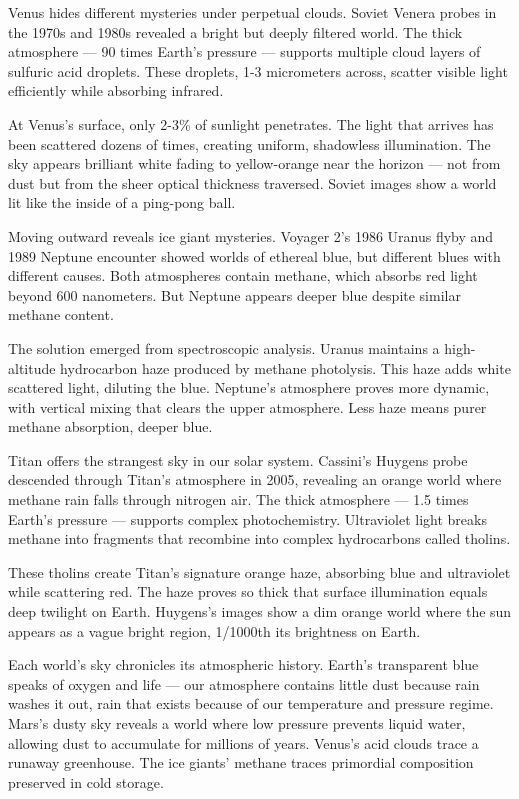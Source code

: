 Venus hides different mysteries under perpetual clouds. Soviet Venera probes in the 1970s and 1980s revealed a bright but deeply filtered world. The thick atmosphere — 90 times Earth's pressure — supports multiple cloud layers of sulfuric acid droplets. These droplets, 1-3 micrometers across, scatter visible light efficiently while absorbing infrared.

At Venus's surface, only 2-3\% of sunlight penetrates. The light that arrives has been scattered dozens of times, creating uniform, shadowless illumination. The sky appears brilliant white fading to yellow-orange near the horizon — not from dust but from the sheer optical thickness traversed. Soviet images show a world lit like the inside of a ping-pong ball.

Moving outward reveals ice giant mysteries. Voyager 2's 1986 Uranus flyby and 1989 Neptune encounter showed worlds of ethereal blue, but different blues with different causes. Both atmospheres contain methane, which absorbs red light beyond 600 nanometers. But Neptune appears deeper blue despite similar methane content.

The solution emerged from spectroscopic analysis. Uranus maintains a high-altitude hydrocarbon haze produced by methane photolysis. This haze adds white scattered light, diluting the blue. Neptune's atmosphere proves more dynamic, with vertical mixing that clears the upper atmosphere. Less haze means purer methane absorption, deeper blue.

Titan offers the strangest sky in our solar system. Cassini's Huygens probe descended through Titan's atmosphere in 2005, revealing an orange world where methane rain falls through nitrogen air. The thick atmosphere — 1.5 times Earth's pressure — supports complex photochemistry. Ultraviolet light breaks methane into fragments that recombine into complex hydrocarbons called tholins.

These tholins create Titan's signature orange haze, absorbing blue and ultraviolet while scattering red. The haze proves so thick that surface illumination equals deep twilight on Earth. Huygens's images show a dim orange world where the sun appears as a vague bright region, 1/1000th its brightness on Earth.

Each world's sky chronicles its atmospheric history. Earth's transparent blue speaks of oxygen and life — our atmosphere contains little dust because rain washes it out, rain that exists because of our temperature and pressure regime. Mars's dusty sky reveals a world where low pressure prevents liquid water, allowing dust to accumulate for millions of years. Venus's acid clouds trace a runaway greenhouse. The ice giants' methane traces primordial composition preserved in cold storage.

